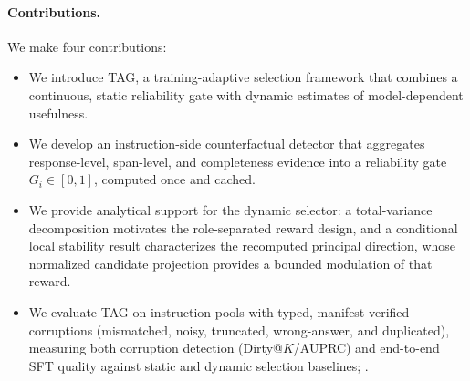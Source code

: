 \paragraph{Contributions.}
We make four contributions:
\begin{itemize}
  \item We introduce \textsc{TAG}, a training-adaptive selection
  framework that combines a continuous, static reliability gate
  with dynamic estimates of model-dependent usefulness.
  \item We develop an instruction-side counterfactual detector that
  aggregates response-level, span-level, and completeness evidence
  into a reliability gate \(G_i\in[0,1]\), computed once and cached.
  \item We provide analytical support for the dynamic selector: a
  total-variance decomposition motivates the role-separated reward
  design, and a conditional local stability result characterizes the
  recomputed principal direction, whose normalized candidate projection
  provides a bounded modulation of that reward.
  \item We evaluate \textsc{TAG} on instruction pools with typed,
  manifest-verified corruptions (mismatched, noisy, truncated,
  wrong-answer, and duplicated), measuring both corruption detection
  (Dirty@\(K\)/AUPRC) and end-to-end SFT quality against static and
  dynamic selection baselines; .
\end{itemize}




